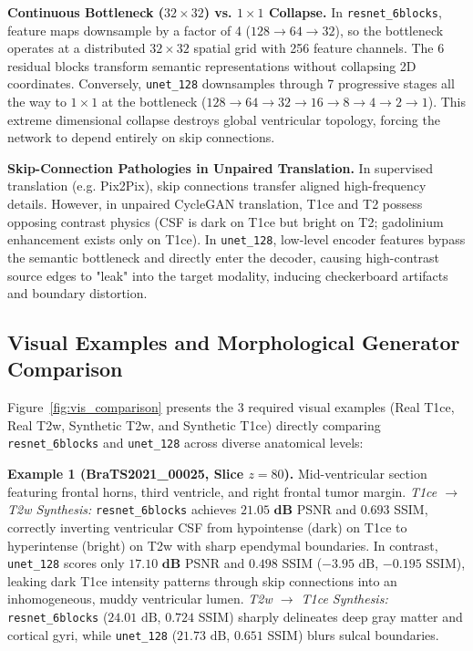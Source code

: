 \documentclass[10pt,twocolumn,letterpaper]{article}
\begin{document}
\textbf{Continuous Bottleneck ($32\times 32$) vs. $1\times 1$ Collapse.} In \texttt{resnet\_6blocks}, feature maps downsample by a factor of 4 ($128 \to 64 \to 32$), so the bottleneck operates at a distributed $32 \times 32$ spatial grid with 256 feature channels. The 6 residual blocks transform semantic representations without collapsing 2D coordinates. Conversely, \texttt{unet\_128} downsamples through 7 progressive stages all the way to $1 \times 1$ at the bottleneck ($128 \to 64 \to 32 \to 16 \to 8 \to 4 \to 2 \to 1$). This extreme dimensional collapse destroys global ventricular topology, forcing the network to depend entirely on skip connections.

\textbf{Skip-Connection Pathologies in Unpaired Translation.} In supervised translation (e.g. Pix2Pix), skip connections transfer aligned high-frequency details. However, in unpaired CycleGAN translation, T1ce and T2 possess opposing contrast physics (CSF is dark on T1ce but bright on T2; gadolinium enhancement exists only on T1ce). In \texttt{unet\_128}, low-level encoder features bypass the semantic bottleneck and directly enter the decoder, causing high-contrast source edges to "leak" into the target modality, inducing checkerboard artifacts and boundary distortion.

\subsection{Visual Examples and Morphological Generator Comparison}
Figure~\ref{fig:vis_comparison} presents the 3 required visual examples (Real T1ce, Real T2w, Synthetic T2w, and Synthetic T1ce) directly comparing \texttt{resnet\_6blocks} and \texttt{unet\_128} across diverse anatomical levels:

\textbf{Example 1 (BraTS2021\_00025, Slice $z=80$).} Mid-ventricular section featuring frontal horns, third ventricle, and right frontal tumor margin.
\textit{T1ce $\to$ T2w Synthesis:} \texttt{resnet\_6blocks} achieves $\mathbf{21.05\text{ dB}}$ PSNR and $\mathbf{0.693}$ SSIM, correctly inverting ventricular CSF from hypointense (dark) on T1ce to hyperintense (bright) on T2w with sharp ependymal boundaries. In contrast, \texttt{unet\_128} scores only $\mathbf{17.10\text{ dB}}$ PSNR and $\mathbf{0.498}$ SSIM ($-3.95\text{ dB}$, $-0.195$ SSIM), leaking dark T1ce intensity patterns through skip connections into an inhomogeneous, muddy ventricular lumen.
\textit{T2w $\to$ T1ce Synthesis:} \texttt{resnet\_6blocks} ($24.01\text{ dB}$, $0.724$ SSIM) sharply delineates deep gray matter and cortical gyri, while \texttt{unet\_128} ($21.73\text{ dB}$, $0.651$ SSIM) blurs sulcal boundaries.
\end{document}
